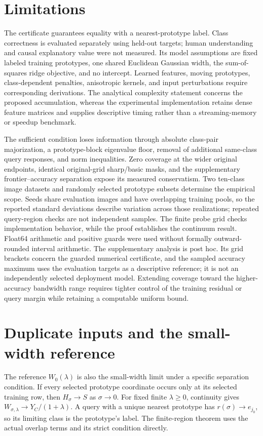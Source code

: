 \documentclass[preprint,12pt]{elsarticle}
\begin{document}
\section{Limitations}
The certificate guarantees equality with a nearest-prototype label. Class correctness is evaluated separately using held-out targets; human understanding and causal explanatory value were not measured. Its model assumptions are fixed labeled training prototypes, one shared Euclidean Gaussian width, the sum-of-squares ridge objective, and no intercept. Learned features, moving prototypes, class-dependent penalties, anisotropic kernels, and input perturbations require corresponding derivations. The analytical complexity statement concerns the proposed accumulation, whereas the experimental implementation retains dense feature matrices and supplies descriptive timing rather than a streaming-memory or speedup benchmark.

The sufficient condition loses information through absolute class-pair majorization, a prototype-block eigenvalue floor, removal of additional same-class query responses, and norm inequalities. Zero coverage at the wider original endpoints, identical original-grid sharp/basic masks, and the supplementary frontier--accuracy separation expose its measured conservatism. Two ten-class image datasets and randomly selected prototype subsets determine the empirical scope. Seeds share evaluation images and have overlapping training pools, so the reported standard deviations describe variation across those realizations; repeated query-region checks are not independent samples. The finite probe grid checks implementation behavior, while the proof establishes the continuum result. Float64 arithmetic and positive guards were used without formally outward-rounded interval arithmetic. The supplementary analysis is post hoc. Its grid brackets concern the guarded numerical certificate, and the sampled accuracy maximum uses the evaluation targets as a descriptive reference; it is not an independently selected deployment model. Extending coverage toward the higher-accuracy bandwidth range requires tighter control of the training residual or query margin while retaining a computable uniform bound.

\appendix
\section{Duplicate inputs and the small-width reference}
\label{app:duplicates}
The reference $W_0(\lambda)$ is also the small-width limit under a specific separation condition. If every selected prototype coordinate occurs only at its selected training row, then $H_\sigma\to S$ as $\sigma\to0$. For fixed finite $\lambda\geq0$, continuity gives $W_{\sigma,\lambda}\to Y_C/(1+\lambda)$. A query with a unique nearest prototype has $r(\sigma)\to e_{j_0}$, so its limiting class is the prototype's label. The finite-region theorem uses the actual overlap terms and its strict condition directly.
\end{document}
